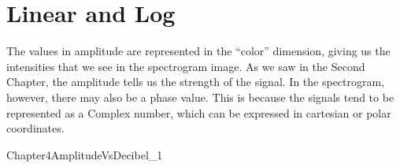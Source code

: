\documentclass{book}
\begin{document}
\section{Linear and Log}
\qquad The values in amplitude are represented in the “color” dimension, giving us the intensities that we see in the spectrogram image. As we saw in the Second Chapter, the amplitude tells us the strength of the signal. In the spectrogram, however, there may also be a phase value. This is because the signals tend to be represented as a Complex number, which can be expressed in cartesian or polar coordinates.
\par
Chapter4AmplitudeVsDecibel\_1



\end{document}
